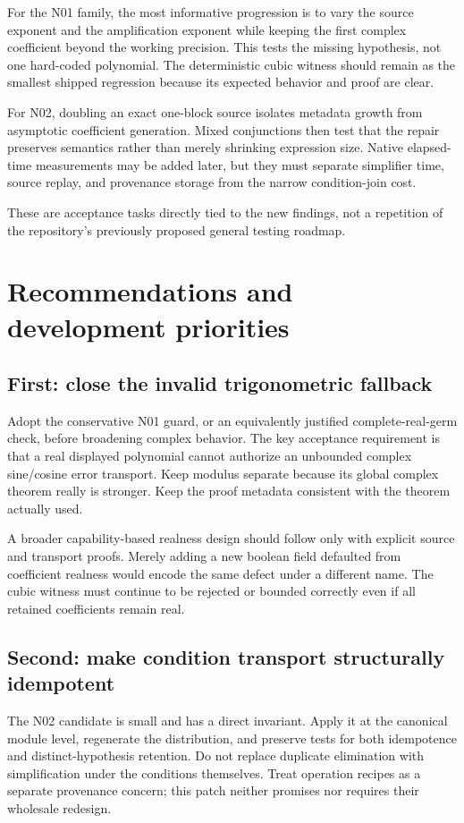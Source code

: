 \documentclass[11pt,a4paper]{article}
\begin{document}
For the N01 family, the most informative progression is to vary the source exponent and the amplification exponent while keeping the first complex coefficient beyond the working precision. This tests the missing hypothesis, not one hard-coded polynomial. The deterministic cubic witness should remain as the smallest shipped regression because its expected behavior and proof are clear.

For N02, doubling an exact one-block source isolates metadata growth from asymptotic coefficient generation. Mixed conjunctions then test that the repair preserves semantics rather than merely shrinking expression size. Native elapsed-time measurements may be added later, but they must separate simplifier time, source replay, and provenance storage from the narrow condition-join cost.

These are acceptance tasks directly tied to the new findings, not a repetition of the repository's previously proposed general testing roadmap.

\section{Recommendations and development priorities}
\label{sec:priorities}
\subsection{First: close the invalid trigonometric fallback}
Adopt the conservative N01 guard, or an equivalently justified complete-real-germ check, before broadening complex behavior. The key acceptance requirement is that a real displayed polynomial cannot authorize an unbounded complex sine/cosine error transport. Keep modulus separate because its global complex theorem really is stronger. Keep the proof metadata consistent with the theorem actually used.

A broader capability-based realness design should follow only with explicit source and transport proofs. Merely adding a new boolean field defaulted from coefficient realness would encode the same defect under a different name. The cubic witness must continue to be rejected or bounded correctly even if all retained coefficients remain real.

\subsection{Second: make condition transport structurally idempotent}
The N02 candidate is small and has a direct invariant. Apply it at the canonical module level, regenerate the distribution, and preserve tests for both idempotence and distinct-hypothesis retention. Do not replace duplicate elimination with simplification under the conditions themselves. Treat operation recipes as a separate provenance concern; this patch neither promises nor requires their wholesale redesign.
\end{document}
